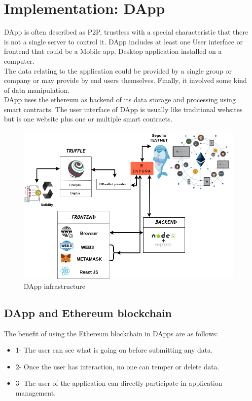 \chapter{Implementation: DApp}
DApp is often described as P2P, trustless with a special characteristic that there is not a single server to control it. DApp includes at least one User interface or frontend that could be a Mobile app, Desktop application installed on a computer.\\
The data relating to the application could be provided by a single group or company or may provide by end users themselves. Finally, it involved some kind of data manipulation. \\
DApp uses the ethereum as backend of its data storage and processing using smart contracts. The user interface of DApp is usually like traditional websites but is one website plus one or multiple smart contracts.

\begin{center}
	
	\begin{figure}[htb!]
		
		\begin{minipage}{0.75\linewidth}
			
			\includegraphics[width=1.45\textwidth]{images/chap03_dapp.png}
		\end{minipage}
		\caption{DApp infrastructure}
		
	\end{figure}
	
\end{center}

\section{DApp and Ethereum blockchain}
The benefit of using the Ethereum blockchain in DApps are as follows:
 \begin{itemize}
     \item 1- The user can see what is going on before submitting any data.
     \item 2- Once the user has interaction, no one can temper or delete data.
     \item 3- The user of the application can directly participate in application management.
 \end{itemize}

